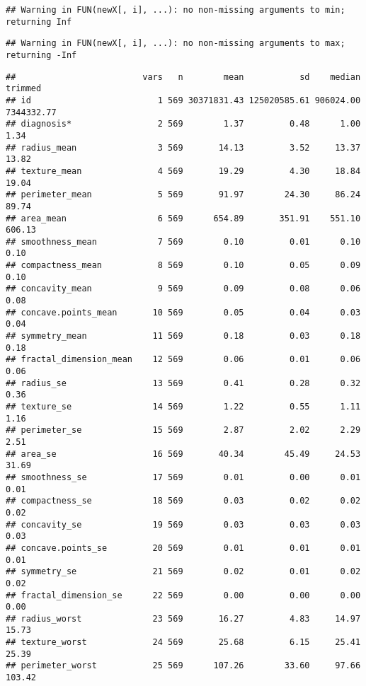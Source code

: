 \documentclass[
]{article}
\begin{document}
\begin{verbatim}
## Warning in FUN(newX[, i], ...): no non-missing arguments to min; returning Inf
\end{verbatim}

\begin{verbatim}
## Warning in FUN(newX[, i], ...): no non-missing arguments to max; returning -Inf
\end{verbatim}

\begin{verbatim}
##                         vars   n        mean           sd    median    trimmed
## id                         1 569 30371831.43 125020585.61 906024.00 7344332.77
## diagnosis*                 2 569        1.37         0.48      1.00       1.34
## radius_mean                3 569       14.13         3.52     13.37      13.82
## texture_mean               4 569       19.29         4.30     18.84      19.04
## perimeter_mean             5 569       91.97        24.30     86.24      89.74
## area_mean                  6 569      654.89       351.91    551.10     606.13
## smoothness_mean            7 569        0.10         0.01      0.10       0.10
## compactness_mean           8 569        0.10         0.05      0.09       0.10
## concavity_mean             9 569        0.09         0.08      0.06       0.08
## concave.points_mean       10 569        0.05         0.04      0.03       0.04
## symmetry_mean             11 569        0.18         0.03      0.18       0.18
## fractal_dimension_mean    12 569        0.06         0.01      0.06       0.06
## radius_se                 13 569        0.41         0.28      0.32       0.36
## texture_se                14 569        1.22         0.55      1.11       1.16
## perimeter_se              15 569        2.87         2.02      2.29       2.51
## area_se                   16 569       40.34        45.49     24.53      31.69
## smoothness_se             17 569        0.01         0.00      0.01       0.01
## compactness_se            18 569        0.03         0.02      0.02       0.02
## concavity_se              19 569        0.03         0.03      0.03       0.03
## concave.points_se         20 569        0.01         0.01      0.01       0.01
## symmetry_se               21 569        0.02         0.01      0.02       0.02
## fractal_dimension_se      22 569        0.00         0.00      0.00       0.00
## radius_worst              23 569       16.27         4.83     14.97      15.73
## texture_worst             24 569       25.68         6.15     25.41      25.39
## perimeter_worst           25 569      107.26        33.60     97.66     103.42

\end{verbatim}
\end{document}
